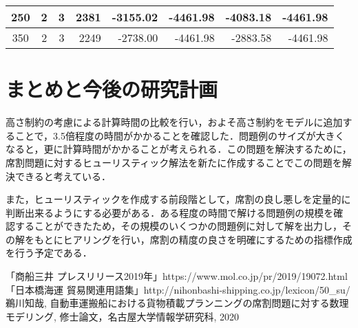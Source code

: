 \documentclass[a4j,11pt,twocolumn]{jsarticle}
\begin{document}
\begin{table}[]
\begin{tabular}{|c|c|c|r|r|r|r|r|}
  250   & 2       & 3       & 2381                                                  & -3155.02                                                               & -4461.98                                                                 & -4083.18                                                                & -4461.98                                                                  \\ \hline
  350   & 2       & 3       & 2249                                                  & -2738.00                                                               & -4461.98                                                                 & -2883.58                                                                & -4461.98                                                                  \\ \hline
  \end{tabular}
  \end{table}


\section{まとめと今後の研究計画}
高さ制約の考慮による計算時間の比較を行い，およそ高さ制約をモデルに追加することで，3.5倍程度の時間がかかることを確認した．問題例のサイズが大きくなると，更に計算時間がかかることが考えられる．この問題を解決するために，席割問題に対するヒューリスティック解法を新たに作成することでこの問題を解決できると考えている．

また，ヒューリスティックを作成する前段階として，席割の良し悪しを定量的に判断出来るようにする必要がある．ある程度の時間で解ける問題例の規模を確認することができたため，その規模のいくつかの問題例に対して解を出力し，その解をもとにヒアリングを行い，席割の精度の良さを明確にするための指標作成を行う予定である．

\begin{thebibliography}{2}
  「商船三井 プレスリリース2019年」https://www.mol.co.jp/pr/2019/19072.html
  「日本橋海運 貿易関連用語集」http://nihonbashi-shipping.co.jp/lexicon/50\_su/
 鵜川知哉, 自動車運搬船における貨物積載プランニングの席割問題に対する数理モデリング, 修士論文，名古屋大学情報学研究科, 2020
\end{thebibliography}
\end{document}
